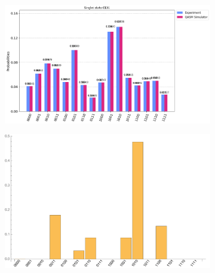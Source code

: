 \documentclass[10pt]{amsart}
\theoremstyle{definition}
\begin{document}
\begin{figure}[hbt]
    \begin{subfigure}{0.4\textwidth}
    \centering
    \includegraphics[width=0.9\linewidth]{inputSing1_quantum.png}
  \end{subfigure}
  \begin{subfigure}{0.4\textwidth}
    \centering
    \includegraphics[width=0.9\linewidth]{inputSing1_exact.pdf}
  \end{subfigure}
  

\end{figure}
\end{document}
